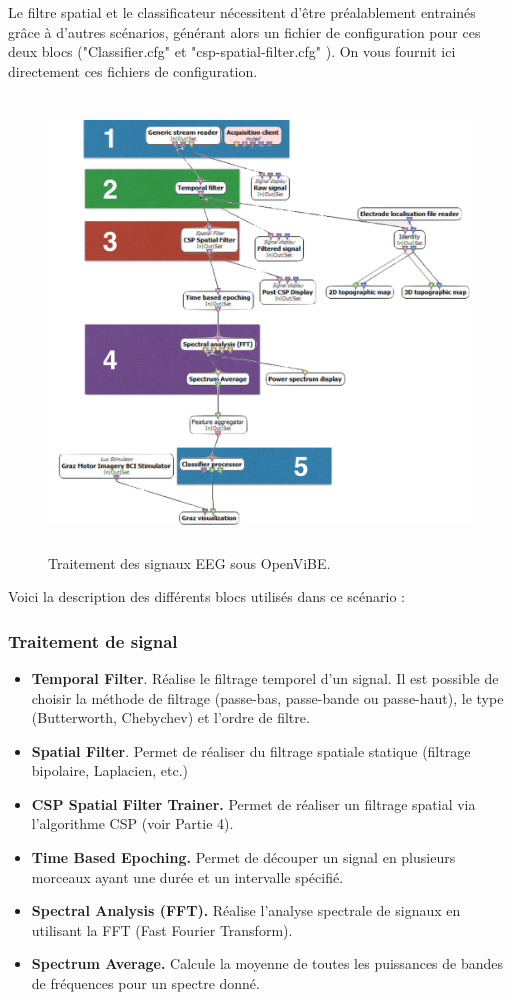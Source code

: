 Le filtre spatial et le classificateur nécessitent d'être préalablement entrainés grâce à d'autres scénarios, générant alors un fichier de configuration pour ces deux blocs ("Classifier.cfg" et "csp-spatial-filter.cfg" ). On vous fournit ici directement ces fichiers de configuration.

\begin{figure}[h]
	\centering\includegraphics[height=12cm]{images/scenario_neuro_color.png}
	\caption{Traitement des signaux EEG sous OpenViBE.}
	\label{fig:interface_travail_ov_2}
\end{figure}


Voici la description des différents blocs utilisés dans ce scénario :

\subsubsection*{Traitement de signal}
\begin{itemize}
	\smallbreak
	\item \textbf{Temporal Filter}. Réalise le filtrage temporel d'un signal. Il est possible de choisir la méthode de filtrage (passe-bas, passe-bande ou passe-haut), le type (Butterworth, Chebychev) et l'ordre de filtre.
	\smallbreak
	\item \textbf{Spatial Filter}. Permet de réaliser du filtrage spatiale statique (filtrage bipolaire, Laplacien, etc.)
	\smallbreak
	\item \textbf{CSP Spatial Filter Trainer.} Permet de réaliser un filtrage spatial via l'algorithme CSP (voir Partie 4).
	\smallbreak
	\item  \textbf{Time Based Epoching.} Permet de découper un signal en plusieurs morceaux ayant une durée et un intervalle spécifié.
	\smallbreak
	\item \textbf{Spectral Analysis (FFT).} Réalise l'analyse spectrale de signaux en utilisant la FFT (Fast Fourier Transform).
	\smallbreak
	\item \textbf{Spectrum Average.} Calcule la moyenne de toutes les puissances de bandes de fréquences pour un spectre donné.
\end{itemize}

